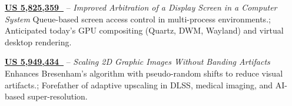 \documentclass[letterpaper,11pt]{article}
\begin{document}
\vspace{0.5em}

\textbf{\href{https://patents.google.com/patent/US5825359}{US 5,825,359~\faExternalLink}} – \textit{Improved Arbitration of a Display Screen in a Computer System}
\textbullet{} Queue-based screen access control in multi-process environments.; Anticipated today’s GPU compositing (Quartz, DWM, Wayland) and virtual desktop rendering.

\vspace{0.5em}

\textbf{\href{https://patents.google.com/patent/US5949434}{US 5,949,434~\faExternalLink}} – \textit{Scaling 2D Graphic Images Without Banding Artifacts}
\textbullet{} Enhances Bresenham’s algorithm with pseudo-random shifts to reduce visual artifacts.; Forefather of adaptive upscaling in DLSS, medical imaging, and AI-based super-resolution.
\end{document}
